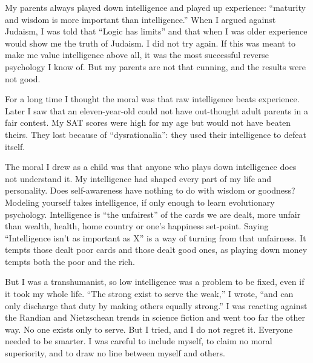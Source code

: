 
My parents always played down intelligence and played up experience: ``maturity and wisdom is more important than intelligence.'' When I argued against Judaism, I was told that ``Logic has limits'' and that when I was older experience would show me the truth of Judaism. I did not try again. If this was meant to make me value intelligence above all, it was the most successful reverse psychology I know of. But my parents are not that cunning, and the results were not good.

For a long time I thought the moral was that raw intelligence beats experience. Later I saw that an eleven-year-old could not have out-thought adult parents in a fair contest. My SAT scores were high for my age but would not have beaten theirs. They lost because of ``dysrationalia'': they used their intelligence to defeat itself.

The moral I drew as a child was that anyone who plays down intelligence does not understand it. My intelligence had shaped every part of my life and personality. Does self-awareness have nothing to do with wisdom or goodness? Modeling yourself takes intelligence, if only enough to learn evolutionary psychology. Intelligence is ``the unfairest'' of the cards we are dealt, more unfair than wealth, health, home country or one's happiness set-point. Saying ``Intelligence isn't as important as X'' is a way of turning from that unfairness. It tempts those dealt poor cards and those dealt good ones, as playing down money tempts both the poor and the rich. 

But I was a transhumanist, so low intelligence was a problem to be fixed, even if it took my whole life. ``The strong exist to serve the weak,'' I wrote, ``and can only discharge that duty by making others equally strong.'' I was reacting against the Randian and Nietzschean trends in science fiction and went too far the other way. No one exists only to serve. But I tried, and I do not regret it. Everyone needed to be smarter. I was careful to include myself, to claim no moral superiority, and to draw no line between myself and others. 

